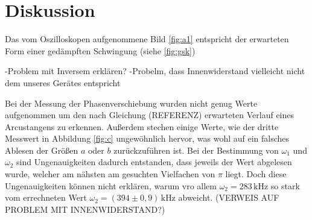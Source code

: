 \section{Diskussion}
\label{sec:Diskussion}
Das vom Oszilloskopen aufgenommene Bild \ref{fig:a1}
entspricht der erwarteten Form einer gedämpften Schwingung (siehe \ref{fig:gsk})

-Problem mit Inversem erklären?
-Probelm, dass Innenwiderstand vielleicht nicht dem
unseres Gerätes entspricht


Bei der Messung der Phasenverschiebung wurden nicht
genug Werte aufgenommen um den nach Gleichung (REFERENZ)
erwarteten Verlauf eines Arcustangens zu erkennen.
Außerdem stechen einige Werte, wie der dritte Messwert
in Abbildung \ref{fig:c} ungewöhnlich hervor, was
wohl auf ein falsches Ablesen der Größen $a$ oder
$b$ zurückzuführen ist. Bei der Bestimmung
von $\omega_1$ und $\omega_2$ sind Ungenauigkeiten
dadurch entstanden, dass jeweils der Wert abgelesen wurde,
welcher am nähsten am gesuchten Vielfachen von $\pi$
liegt. Doch diese Ungenauigkeiten können nicht erklären,
warum vro allem $\omega_2=283\,\si{\kilo\hertz}$ so stark vom errechneten Wert
$\omega_2=(394\pm0,9)\,\si{\kilo\hertz}$ abweicht.
(VERWEIS AUF PROBLEM MIT INNENWIDERSTAND?)